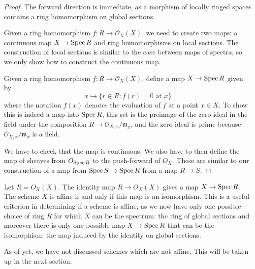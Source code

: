 \begin{proof}
The forward direction is immediate, as a morphism of locally ringed spaces contains a ring homomorphism on global sections. 

Given a ring homomorphism $f \colon R \to \mathcal{O}_X(X)$, we need to create two maps: a continuous map $X \to \operatorname{Spec} R$ and ring homomorphisms on local sections. The construction of local sections is similar to the case between maps of spectra, so we only show how to construct the continuous map.

Given a ring homomorphism $f \colon R \to \mathcal{O}_X(X)$, define a map $X \to \operatorname{Spec} R$ given by
\begin{equation}
x \mapsto \{r \in R \colon f(r) = 0 \text{ at } x\}
\end{equation}
where the notation $f(x)$ denotes the evaluation of $f$ at a point $x \in X$. To show this is indeed a map into $\operatorname{Spec} R$, this set is the preimage of the zero ideal in the field under the composition $R \to \mathcal{O}_{X,x}/\mathfrak{m}_x$, and the zero ideal is prime because $\mathcal{O}_{X,x}/\mathfrak{m}_x$ is a field.


We have to check that the map is continuous.
We also have to then define the map of sheaves from \(O_{\operatorname{Spec} R}\) to the push-forward of \(O_X\).
These are similar to our construction of a map from \(\operatorname{Spec} S \to \operatorname{Spec} R\) from a map \(R \to S\).
\end{proof}

\begin{remark}
  Let \(R = O_X(X)\).
  The identity map \(R \to O_X(X)\) gives a map \(X \to \operatorname{Spec} R\).
  The scheme \(X\) is affine if and only if this map is an isomorphism.  This is a useful criterion in determining if a scheme is affine, as we now have only one possible choice of ring $R$ for which $X$ can be the spectrum: the ring of global sections and moreover there is only one possible map \(X \to \operatorname{Spec} R\) that can be the isomorphism: the map induced by the identity on global sections.
\end{remark}

As of yet, we have not discussed schemes which are not affine. This will be taken up in the next section.


